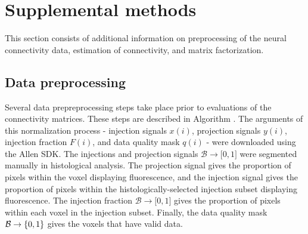 \newpage 
\section{Supplemental methods}
\label{supp_sec:methods}

This section consists of additional information on preprocessing of the neural connectivity data, estimation of connectivity, and matrix factorization.

\subsection{Data preprocessing}
\label{supp_sec:dp}

Several data prepreprocessing steps take place prior to evaluations of the connectivity matrices.
These steps are described in Algorithm \pre.
The arguments of this normalization process - injection signals $x(i)$, projection signals $y(i)$, injection fraction $F(i)$, and data quality mask $q(i)$ - were downloaded using the Allen SDK. %
The injections and projection signals $ \mathcal B \to \mathbb [0,1]$ were segmented manually in histological analysis.
The projection signal gives the proportion of pixels within the voxel displaying fluorescence, and the injection signal gives the proportion of pixels within the histologically-selected injection subset displaying fluorescence.
The injection fraction $ \mathcal B \to \mathbb [0,1]$ gives the proportion of pixels within each voxel in the injection subset.
Finally, the data quality mask $ \mathcal B \to \mathbb \{0,1\}$ gives the voxels that have valid data.

